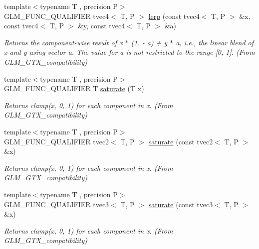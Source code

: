\begin{DoxyCompactItemize}
{\footnotesize template$<$typename T , precision P$>$ }\\G\+L\+M\+\_\+\+F\+U\+N\+C\+\_\+\+Q\+U\+A\+L\+I\+F\+I\+E\+R tvec4$<$ T, P $>$ \hyperlink{group__gtx__compatibility_gae4b0244b0d882657bed0a99dfa33f379}{lerp} (const tvec4$<$ T, P $>$ \&x, const tvec4$<$ T, P $>$ \&y, const tvec4$<$ T, P $>$ \&a)
\begin{DoxyCompactList}\small\item\em Returns the component-\/wise result of x $\ast$ (1. -\/ a) + y $\ast$ a, i.\+e., the linear blend of x and y using vector a. The value for a is not restricted to the range \mbox{[}0, 1\mbox{]}. (From G\+L\+M\+\_\+\+G\+T\+X\+\_\+compatibility) \end{DoxyCompactList}\item 
{\footnotesize template$<$typename T , precision P$>$ }\\G\+L\+M\+\_\+\+F\+U\+N\+C\+\_\+\+Q\+U\+A\+L\+I\+F\+I\+E\+R T \hyperlink{group__gtx__compatibility_ga0fd09e616d122bc2ed9726682ffd44b7}{saturate} (T x)
\begin{DoxyCompactList}\small\item\em Returns clamp(x, 0, 1) for each component in x. (From G\+L\+M\+\_\+\+G\+T\+X\+\_\+compatibility) \end{DoxyCompactList}\item 
{\footnotesize template$<$typename T , precision P$>$ }\\G\+L\+M\+\_\+\+F\+U\+N\+C\+\_\+\+Q\+U\+A\+L\+I\+F\+I\+E\+R tvec2$<$ T, P $>$ \hyperlink{group__gtx__compatibility_ga5815a26488231dfdf92242cf0c2d2107}{saturate} (const tvec2$<$ T, P $>$ \&x)
\begin{DoxyCompactList}\small\item\em Returns clamp(x, 0, 1) for each component in x. (From G\+L\+M\+\_\+\+G\+T\+X\+\_\+compatibility) \end{DoxyCompactList}\item 
{\footnotesize template$<$typename T , precision P$>$ }\\G\+L\+M\+\_\+\+F\+U\+N\+C\+\_\+\+Q\+U\+A\+L\+I\+F\+I\+E\+R tvec3$<$ T, P $>$ \hyperlink{group__gtx__compatibility_ga02ed1a53c6df104d56b69f8fb5e9af1b}{saturate} (const tvec3$<$ T, P $>$ \&x)
\begin{DoxyCompactList}\small\item\em Returns clamp(x, 0, 1) for each component in x. (From G\+L\+M\+\_\+\+G\+T\+X\+\_\+compatibility) \end{DoxyCompactList}\item 

\end{DoxyCompactItemize}
